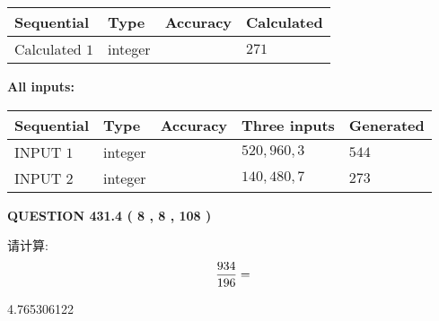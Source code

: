\documentclass{ctexart}
\begin{document}
   
   
   
\noindent{}
   
   
  
  
\noindent\begin{tabular}{|l|l|l|l|}
\hline
 Sequential & Type & Accuracy & Calculated \\ 
\hline
 
 
  Calculated $  1 $ & integer &  & 
  $ 271 $ 
 \\  \hline  
 \end{tabular}
   
   
   
   
\noindent\vspace{0.1in}\hspace{-0.08in} {\textbf{\Large{All inputs: }}}
   
   
  
  
\noindent\begin{tabular}{|l|l|l|l|l|}
\hline
 Sequential & Type & Accuracy & Three inputs & Generated \\ 
\hline
 
 
  INPUT $  1 $ & integer &  & $
 520
 , 
 960
 , 
 3
 $ & $ 544 $ 
 \\  \hline  
 
 
  INPUT $  2 $ & integer &  & $
 140
 , 
 480
 , 
 7
 $ & $ 273 $ 
 \\  \hline  
 \end{tabular}
   
   
  
\vspace{0.2in}
  
{\textbf{\Large{QUESTION
431.4 
 ( 8 , 8 , 108 )
}}}
  
  
 
请计算:
\begin{equation}
\frac { %
934 }  {  %
196} = \nonumber
\end{equation}
 
 
 
\noindent{}
 
 

4.765306122
 
 
\noindent{}
 
 

 
 
 
\noindent{}
 
\end{document}
